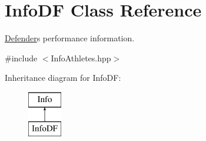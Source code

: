 \hypertarget{class_info_d_f}{}\section{Info\+DF Class Reference}
\label{class_info_d_f}


\hyperlink{class_defender}{Defender}\textquotesingle{}s performance information.  




{\ttfamily \#include $<$Info\+Athletes.\+hpp$>$}

Inheritance diagram for Info\+DF\+:\begin{figure}[H]
\begin{center}
\leavevmode
\includegraphics[height=2.000000cm]{class_info_d_f}
\end{center}
\end{figure}
